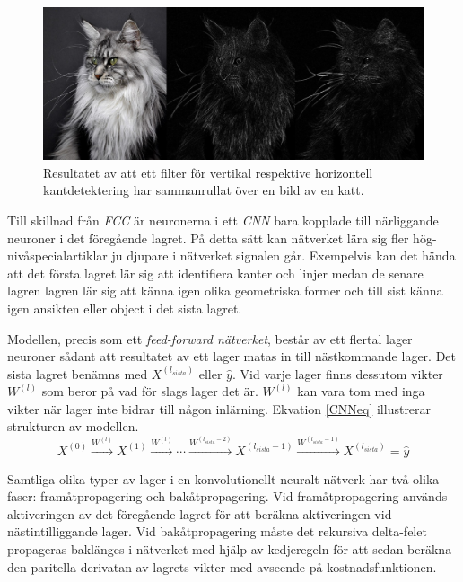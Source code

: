 \documentclass[a4paper,11pt,twoside]{article}
\begin{document}
\begin{figure}[h]\label{figkatter}
	\centering
  		\includegraphics[scale=0.33]{katter.png}
  	\caption{Resultatet av att ett filter för vertikal respektive horizontell kantdetektering har sammanrullat över en bild av en katt.}
\end{figure}

Till skillnad från \textit{FCC} är neuronerna i ett \textit{CNN} bara kopplade till närliggande neuroner i det föregående lagret. På detta sätt kan nätverket lära sig fler hög-nivåspecialartiklar ju djupare i nätverket signalen går. Exempelvis kan det hända att det första lagret lär sig att identifiera kanter och linjer medan de senare lagren lagren lär sig att känna igen olika geometriska former och till sist känna igen ansikten eller object i det sista lagret. \cite{cs231n}

Modellen, precis som ett \textit{feed-forward nätverket}, består av ett flertal lager neuroner sådant att resultatet av ett lager matas in till nästkommande lager. Det sista lagret benämns med $X^{(l_{sista})}$ eller $\hat{y}$. Vid varje lager finns dessutom vikter $W^{(l)}$  som beror på vad för slags lager det är. $W^{(l)}$ kan vara tom med inga vikter när lager inte bidrar till någon inlärning. Ekvation \eqref{CNNeq} illustrerar strukturen av modellen.\cite{cs231n} \cite{convmath}
\begin{equation}\label{CNNeq}
X^{(0)} \xrightarrow{W^{(l)}} X^{(1)}  \xrightarrow{W^{(l)}} \cdots  \xrightarrow{W^{(l_{sista}-2)}} X^{(l_{sista}-1)}  \xrightarrow{W^{(l_{sista}-1)}} X^{(l_{sista})} = \hat{y}
\end{equation}

Samtliga olika typer av lager i en konvolutionellt neuralt nätverk har två olika faser: framåtpropagering och bakåtpropagering. Vid framåtpropagering används aktiveringen av det föregående lagret för att beräkna aktiveringen vid nästintilliggande lager. Vid bakåtpropagering måste det rekursiva delta-felet propageras baklänges i nätverket med hjälp av kedjeregeln för att sedan beräkna den paritella derivatan av lagrets vikter med avseende på kostnadsfunktionen. \cite{cs231n}
\end{document}
